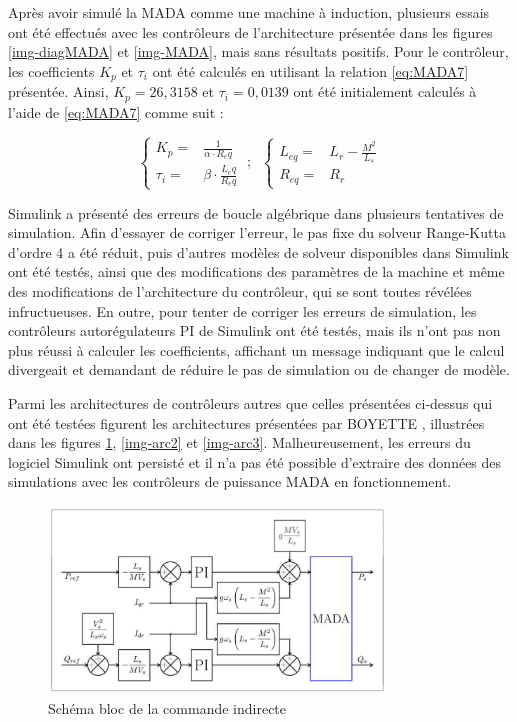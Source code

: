 Après avoir simulé la MADA comme une machine à induction, plusieurs essais ont été effectués avec les contrôleurs de l'architecture présentée dans les figures \ref{img-diagMADA} et \ref{img-MADA}, mais sans résultats positifs. Pour le contrôleur, les coefficients $K_p$ et $\tau_i$ ont été calculés en utilisant la relation \ref{eq:MADA7} présentée. Ainsi, $K_p = 26,3158$ et $\tau_i = 0,0139$ ont été initialement calculés à l'aide de \ref{eq:MADA7} comme suit :


\begin{equation*}
    \left\{
    \begin{aligned}
        K_p =& \frac{1}{\alpha \cdot R_eq} \\
        \tau_i =& \beta \cdot \frac{L_eq}{R_eq}
    \end{aligned}
    \right. \;; \;\;
    \left\{
    \begin{aligned}
        L_{eq} =& L_r - \frac{M^2}{L_s} \\
        R_{eq} =& R_r
    \end{aligned}
    \right.
\end{equation*}

Simulink a présenté des erreurs de boucle algébrique dans plusieurs tentatives de simulation. Afin d'essayer de corriger l'erreur, le pas fixe du solveur Range-Kutta d'ordre 4 a été réduit, puis d'autres modèles de solveur disponibles dans Simulink ont été testés, ainsi que des modifications des paramètres de la machine et même des modifications de l'architecture du contrôleur, qui se sont toutes révélées infructueuses. En outre, pour tenter de corriger les erreurs de simulation, les contrôleurs autorégulateurs PI de Simulink ont été testés, mais ils n'ont pas non plus réussi à calculer les coefficients, affichant un message indiquant que le calcul divergeait et demandant de réduire le pas de simulation ou de changer de modèle. 

Parmi les architectures de contrôleurs autres que celles présentées ci-dessus qui ont été testées figurent les architectures présentées par BOYETTE \cite{Boyette2006}, illustrées dans les figures \ref{img-arc1}, \ref{img-arc2} et \ref{img-arc3}. Malheureusement, les erreurs du logiciel Simulink ont persisté et il n'a pas été possible d'extraire des données des simulations avec les contrôleurs de puissance MADA en fonctionnement.


\begin{figure}[!h]
    \centering
    \includegraphics[width=0.8\textwidth]{diagrammes/arc1.png} 
    \caption{Schéma bloc de la commande indirecte \cite{Boyette2006}}
    \label{img-arc1}
\end{figure}

